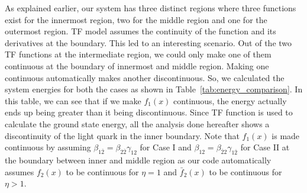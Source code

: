 \documentclass[preprint,12pt]{elsarticle}
\begin{document}
    As explained earlier, our system has three distinct regions where three functions exist for the innermost region, two for the middle region and one for the outermost region. TF model assumes the continuity of the function and its derivatives at the boundary. This led to an interesting scenario. Out of the two TF functions at the intermediate region, we could only make one of them continuous at the boundary of innermost and middle region. Making one continuous automatically makes another discontinuous. So, we calculated the system energies for both the cases as shown in Table~\eqref{tab:energy_comparison}. In this table, we can see that if we make $f_1(x)$ continuous, the energy actually ends up being greater than it being discontinuous. Since TF function is used to calculate the ground state energy, all the analysis done hereafter shows a discontinuity of the light quark in the inner boundary. Note that $f_{1}(x)$ is made continuous by assuming $\beta_{1\overline{2}} = \beta_{2\overline{2}} \gamma_{12}$ for Case I and  $\beta_{12} = \beta_{\overline{2}2} \gamma_{1\overline{2}}$ for Case II at the boundary between inner and middle region as our code automatically assumes $f_{2}(x)$ to be continuous for $\eta = 1$ and $\bar{f}_{2}(x)$ to be continuous for $\eta > 1$.
    
\end{document}
